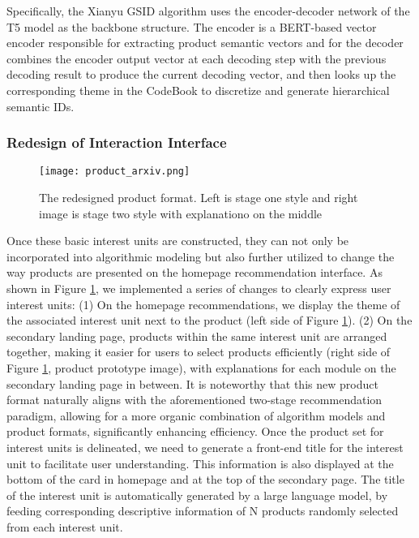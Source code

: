 Specifically, the Xianyu GSID algorithm uses the encoder-decoder network of the T5 model as the backbone structure. The encoder is a BERT-based vector encoder responsible for extracting product semantic vectors and for the decoder combines the encoder output vector at each decoding step with the previous decoding result to produce the current decoding vector, and then looks up the corresponding theme in the CodeBook to discretize and generate hierarchical semantic IDs.
\subsubsection{\textbf{Redesign of Interaction Interface}}
\begin{figure}[tbp]
\texttt{[image: product\_arxiv.png]}
\caption{The redesigned product format. Left is stage one style  and right image is stage two style with explanationo on the middle}
\label{fig:new_product}
\end{figure}
% 
Once these basic interest units are constructed, they can not only be incorporated into algorithmic modeling but also further utilized to change the way products are presented on the homepage recommendation interface. As shown in Figure \ref{fig:new_product}, we implemented a series of changes to clearly express user interest units: (1) On the homepage recommendations, we display the theme of the associated interest unit next to the product (left side of Figure \ref{fig:new_product}). (2) On the secondary landing page, products within the same interest unit are arranged together, making it easier for users to select products efficiently (right side of Figure \ref{fig:new_product}, product prototype image), with explanations for each module on the secondary landing page in between.
It is noteworthy that this new product format naturally aligns with the aforementioned two-stage recommendation paradigm, allowing for a more organic combination of algorithm models and product formats, significantly enhancing efficiency. Once the product set for interest units is delineated, we need to generate a front-end title for the interest unit to facilitate user understanding. This information is also displayed at the bottom of the card in homepage and at the top of the secondary page. The title of the interest unit is automatically generated by a large language model, by feeding corresponding descriptive information of N products randomly selected from each interest unit.

